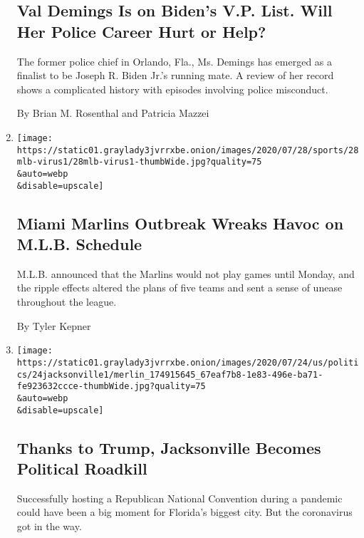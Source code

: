 \begin{enumerate}
  \hypertarget{val-demings-is-on-bidens-vp-list-will-her-police-career-hurt-or-help}{%
  \subsection{Val Demings Is on Biden's V.P. List. Will Her Police
  Career Hurt or
  Help?}\label{val-demings-is-on-bidens-vp-list-will-her-police-career-hurt-or-help}}

  The former police chief in Orlando, Fla., Ms. Demings has emerged as a
  finalist to be Joseph R. Biden Jr.'s running mate. A review of her
  record shows a complicated history with episodes involving police
  misconduct.

  By Brian M. Rosenthal and Patricia Mazzei
\item
  \href{/2020/07/28/sports/baseball/marlins-outbreak-mlb-coronavirus.html}{}

  \texttt{[image: https://static01.graylady3jvrrxbe.onion/images/2020/07/28/sports/28mlb-virus1/28mlb-virus1-thumbWide.jpg?quality=75\\\&auto=webp\\\&disable=upscale]}

  \hypertarget{miami-marlins-outbreak-wreaks-havoc-on-mlb-schedule}{%
  \subsection{Miami Marlins Outbreak Wreaks Havoc on M.L.B.
  Schedule}\label{miami-marlins-outbreak-wreaks-havoc-on-mlb-schedule}}

  M.L.B. announced that the Marlins would not play games until Monday,
  and the ripple effects altered the plans of five teams and sent a
  sense of unease throughout the league.

  By Tyler Kepner
\item
  \href{/2020/07/25/us/politics/trump-rnc-jacksonville.html}{}

  \texttt{[image: https://static01.graylady3jvrrxbe.onion/images/2020/07/24/us/politics/24jacksonville1/merlin\_174915645\_67eaf7b8-1e83-496e-ba71-fe923632ccce-thumbWide.jpg?quality=75\\\&auto=webp\\\&disable=upscale]}

  \hypertarget{thanks-to-trump-jacksonville-becomes-political-roadkill}{%
  \subsection{Thanks to Trump, Jacksonville Becomes Political
  Roadkill}\label{thanks-to-trump-jacksonville-becomes-political-roadkill}}

  Successfully hosting a Republican National Convention during a
  pandemic could have been a big moment for Florida's biggest city. But
  the coronavirus got in the way.


\end{enumerate}
